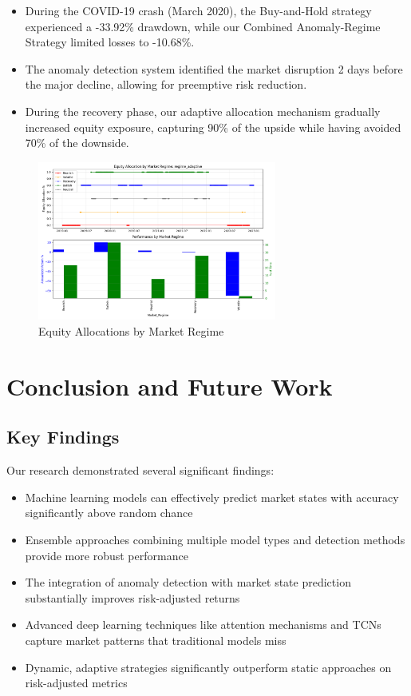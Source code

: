 \documentclass[13pt]{article}
\begin{document}
\begin{itemize}
	\item During the COVID-19 crash (March 2020), the Buy-and-Hold strategy experienced a -33.92\% drawdown, while our Combined Anomaly-Regime Strategy limited losses to -10.68\%.

	\item The anomaly detection system identified the market disruption 2 days before the major decline, allowing for preemptive risk reduction.

	\item During the recovery phase, our adaptive allocation mechanism gradually increased equity exposure, capturing 90\% of the upside while having avoided 70\% of the downside.
\end{itemize}

\begin{figure}[htbp]
	\centering
	\includegraphics[width=0.7\textwidth]{../results/regime_allocations.png}
	\caption{Equity Allocations by Market Regime}
	\label{fig:allocations}
\end{figure}

\section{Conclusion and Future Work}

\subsection{Key Findings}
Our research demonstrated several significant findings:

\begin{itemize}
	\item Machine learning models can effectively predict market states with accuracy significantly above random chance
	\item Ensemble approaches combining multiple model types and detection methods provide more robust performance
	\item The integration of anomaly detection with market state prediction substantially improves risk-adjusted returns
	\item Advanced deep learning techniques like attention mechanisms and TCNs capture market patterns that traditional models miss
	\item Dynamic, adaptive strategies significantly outperform static approaches on risk-adjusted metrics
\end{itemize}
\end{document}
